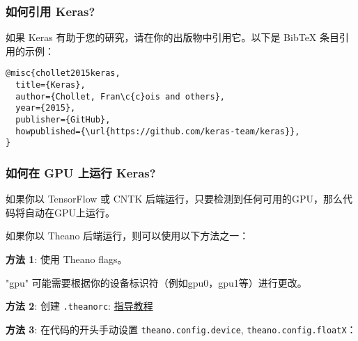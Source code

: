 \subsubsection{如何引用 Keras?}\label{how-should-i-cite-keras}

如果 Keras 有助于您的研究，请在你的出版物中引用它。以下是 BibTeX
条目引用的示例：

\begin{verbatim}
@misc{chollet2015keras,
  title={Keras},
  author={Chollet, Fran\c{c}ois and others},
  year={2015},
  publisher={GitHub},
  howpublished={\url{https://github.com/keras-team/keras}},
}
\end{verbatim}



\subsubsection{如何在 GPU 上运行
Keras?}\label{how-can-i-run-keras-on-gpu}

如果你以 TensorFlow 或 CNTK
后端运行，只要检测到任何可用的GPU，那么代码将自动在GPU上运行。

如果你以 Theano 后端运行，则可以使用以下方法之一：

\textbf{方法 1}: 使用 Theano flags。

\begin{Shaded}
\begin{Highlighting}[]
\end{Highlighting}
\end{Shaded}

"gpu" 可能需要根据你的设备标识符（例如gpu0，gpu1等）进行更改。

\textbf{方法 2}: 创建 \texttt{.theanorc}:
\href{http://deeplearning.net/software/theano/library/config.html}{指导教程}

\textbf{方法 3}: 在代码的开头手动设置 \texttt{theano.config.device},
\texttt{theano.config.floatX}：

\begin{Shaded}
\begin{Highlighting}[]
 
\OperatorTok{=} 
\OperatorTok{=} 
\end{Highlighting}
\end{Shaded}




